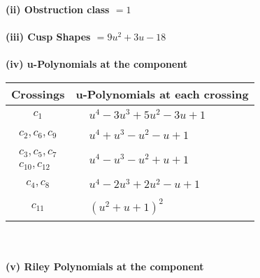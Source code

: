 \documentclass[1p]{elsarticle_modified}
\theoremstyle{definition}
\begin{document}
\flushleft \textbf{(ii) Obstruction class $= 1$}\\~\\
\flushleft \textbf{(iii) Cusp Shapes $= 9 u^2+3 u-18$}\\~\\
\newpage\renewcommand{\arraystretch}{1}
\flushleft \textbf{(iv) u-Polynomials at the component}\newline \\
\begin{tabular}{m{50pt}|m{274pt}}
Crossings & \hspace{64pt}u-Polynomials at each crossing \\
\hline $$\begin{aligned}c_{1}\end{aligned}$$&$\begin{aligned}
&u^4-3 u^3+5 u^2-3 u+1
\end{aligned}$\\
\hline $$\begin{aligned}c_{2},c_{6},c_{9}\end{aligned}$$&$\begin{aligned}
&u^4+u^3- u^2- u+1
\end{aligned}$\\
\hline $$\begin{aligned}c_{3},c_{5},c_{7}\\c_{10},c_{12}\end{aligned}$$&$\begin{aligned}
&u^4- u^3- u^2+u+1
\end{aligned}$\\
\hline $$\begin{aligned}c_{4},c_{8}\end{aligned}$$&$\begin{aligned}
&u^4-2 u^3+2 u^2- u+1
\end{aligned}$\\
\hline $$\begin{aligned}c_{11}\end{aligned}$$&$\begin{aligned}
&(u^2+u+1)^2
\end{aligned}$\\
\hline
\end{tabular}\\~\\
\newpage\renewcommand{\arraystretch}{1}
\flushleft \textbf{(v) Riley Polynomials at the component}\newline \\
\end{document}
